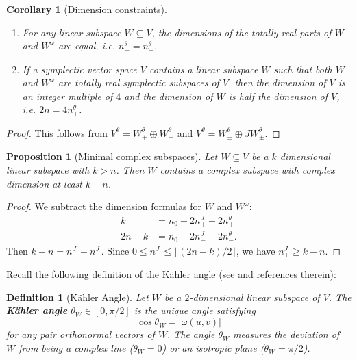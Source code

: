 \documentclass[12pt, final]{article}
\newtheorem{proposition}[theorem]{Proposition}
\newtheorem{definition}[theorem]{Definition}
\newtheorem{corollary}[theorem]{Corollary}
\begin{document}
\begin{corollary}[Dimension constraints] \label{cor:dim_constraints}\
\begin{enumerate}
\item For any linear subspace $W \subseteq V$, the dimensions of the totally real parts of $W$ and $W^\omega$ are equal, i.e. $n_+^\theta = n_-^\theta.$
\item If a symplectic vector space $V$ contains a linear subspace $W$ such that both $W$ and $W^\omega$ are totally real symplectic subspaces of $V$, then the dimension of $V$ is an integer multiple of $4$ and the dimension of $W$ is half the dimension of $V$, i.e. $2n = 4n_+^\theta$.
\end{enumerate}
\end{corollary}
\begin{proof}
This follows from $V^\theta = W_+^\theta\oplus W_-^\theta$ and $V^\theta = W_\pm^\theta \oplus JW_\pm^\theta$. 
\end{proof}

\begin{proposition}[Minimal complex subspaces]\label{prop:minimum_complex}
Let $W\subseteq V$ be a $k$ dimensional linear subspace with $k > n$. Then $W$ contains a complex subspace with complex dimension at least $k-n$.
\end{proposition}
\begin{proof}
We subtract the dimension formulas for $W$ and $W^\omega$:
\begin{align*}
k &= n_0 + 2n_+^J + 2n_+^\theta\\
2n-k &= n_0 + 2n_-^J + 2n_-^\theta.
\end{align*}
Then $k-n = n_+^J - n_-^J$. Since $0 \le n_-^J \le \lfloor (2n-k)/2\rfloor$, we have $n_+^J \ge k-n.$
\end{proof}

Recall the following definition of the K\"{a}hler angle (see \cite{Scharnhorst} and references therein):
\begin{definition}[K\"{a}hler Angle]\label{def:kahler_angle}
Let $W$ be a $2$-dimensional linear subspace of $V$. The \textbf{K\"{a}hler angle} $\theta_W \in [0, \pi/2]$ is the unique angle satisfying
\[
\cos \theta_W = |\omega(u, v)|
\]
for any pair orthonormal vectors of $W$. The angle $\theta_W$ measures the deviation of $W$ from being a complex line ($\theta_W = 0$) or an isotropic plane ($\theta_W = \pi/2$).
\end{definition}
\end{document}

